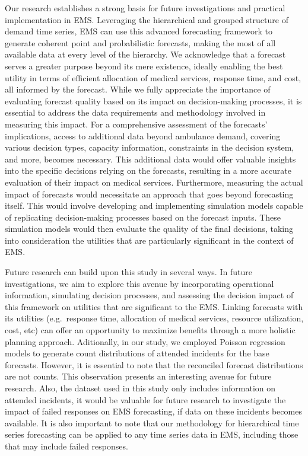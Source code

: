 \documentclass[
  authoryear,
  preprint,
  3p]{elsarticle}
\begin{document}
Our research establishes a strong basis for future investigations and
practical implementation in EMS. Leveraging the hierarchical and grouped
structure of demand time series, EMS can use this advanced forecasting
framework to generate coherent point and probabilistic forecasts, making
the most of all available data at every level of the hierarchy. We
acknowledge that a forecast serves a greater purpose beyond its mere
existence, ideally enabling the best utility in terms of efficient
allocation of medical services, response time, and cost, all informed by
the forecast. While we fully appreciate the importance of evaluating
forecast quality based on its impact on decision-making processes, it is
essential to address the data requirements and methodology involved in
measuring this impact. For a comprehensive assessment of the forecasts'
implications, access to additional data beyond ambulance demand,
covering various decision types, capacity information, constraints in
the decision system, and more, becomes necessary. This additional data
would offer valuable insights into the specific decisions relying on the
forecasts, resulting in a more accurate evaluation of their impact on
medical services. Furthermore, measuring the actual impact of forecasts
would necessitate an approach that goes beyond forecasting itself. This
would involve developing and implementing simulation models capable of
replicating decision-making processes based on the forecast inputs.
These simulation models would then evaluate the quality of the final
decisions, taking into consideration the utilities that are particularly
significant in the context of EMS.

Future research can build upon this study in several ways. In future
investigations, we aim to explore this avenue by incorporating
operational information, simulating decision processes, and assessing
the decision impact of this framework on utilities that are significant
to the EMS. Linking forecasts with its utilities (e.g.~response time,
allocation of medical services, resource utilization, cost, etc) can
offer an opportunity to maximize benefits through a more holistic
planning approach. Aditionally, in our study, we employed Poisson
regression models to generate count distributions of attended incidents
for the base forecasts. However, it is essential to note that the
reconciled forecast distributions are not counts. This observation
presents an interesting avenue for future research. Also, the dataset
used in this study only includes information on attended incidents, it
would be valuable for future research to investigate the impact of
failed responses on EMS forecasting, if data on these incidents becomes
available. It is also important to note that our methodology for
hierarchical time series forecasting can be applied to any time series
data in EMS, including those that may include failed responses.
\end{document}
